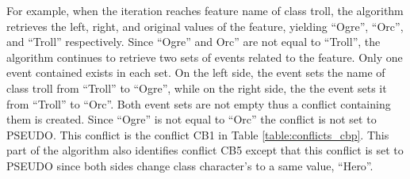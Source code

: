 For example, when the iteration reaches feature \textsf{name} of class \textsf{troll}, the algorithm retrieves the left, right, and original values of the feature, yielding ``Ogre'', ``Orc'', and ``Troll'' respectively. Since ``Ogre'' and Orc'' are not equal to ``Troll'', the algorithm continues to retrieve two sets of events related to the feature. Only one event contained exists in each set. On the left side, the event sets the name of class \textsf{troll} from ``Troll'' to ``Ogre'', while on the right side, the the event sets it from ``Troll'' to ``Orc''. Both event sets are not empty thus a conflict containing them is created. Since ``Ogre'' is not equal to ``Orc'' the conflict is not set to \textsf{PSEUDO}. This conflict is the conflict \textsf{CB1} in Table \ref{table:conflicts_cbp}. This part of the algorithm also identifies conflict \textsf{CB5} except that this conflict is set to \textsf{PSEUDO} since both sides change class \textsf{character}'s  to a same value, ``Hero''. 



